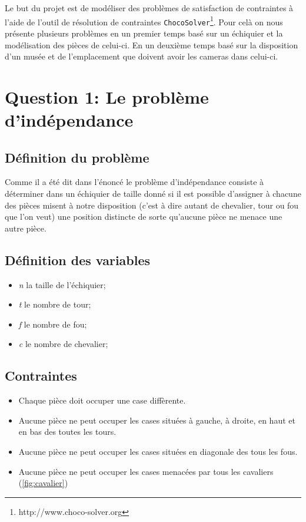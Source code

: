 \documentclass[letterpaper]{article}
\begin{document}
Le but du projet est de modéliser des problèmes de satisfaction de contraintes
à l'aide de l'outil de résolution de contraintes \texttt{ChocoSolver}\footnote{http://www.choco-solver.org}. Pour celà
on nous présente plusieurs problèmes en un premier temps basé sur un échiquier
et la modélisation des pièces de celui-ci. En un deuxième temps basé sur la
disposition d'un musée et de l'emplacement que doivent avoir les cameras dans
celui-ci.

\section{Question 1: Le problème d'indépendance}

\subsection{Définition du problème}

Comme il a été dit dans l'énoncé le problème d'indépendance consiste à
déterminer dans un échiquier de taille donné si il est possible d'assigner à
chacune des pièces misent à notre disposition (c'est à dire autant de
chevalier, tour ou fou que l'on veut) une position distincte de sorte qu'aucune
pièce ne menace une autre pièce.

\subsection{Définition des variables}

\begin{itemize}
\item \textit{n} la taille de l'échiquier;
\item \textit{t} le nombre de tour;
\item \textit{f} le nombre de fou;
\item \textit{c} le nombre de chevalier;
\end{itemize}

\subsection{Contraintes}

\begin{itemize}
\item Chaque pièce doit occuper une case diffèrente.

\item Aucune pièce ne peut occuper les cases situées à gauche, à
  droite, en haut et en bas des toutes les tours.
\item Aucune pièce ne peut occuper les cases situées en diagonale des
  tous les fous.
\item Aucune pièce ne peut occuper les cases menacées par tous les
  cavaliers (\ref{fig:cavalier})
\end{itemize}
\end{document}
